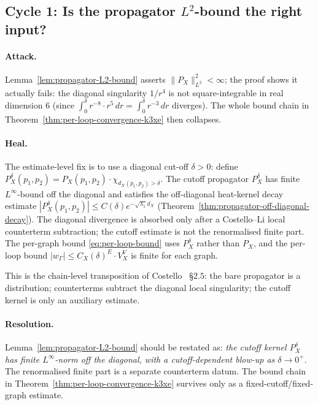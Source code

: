 \documentclass[11pt]{article}
\theoremstyle{definition}\newtheorem{definition}[theorem]{Definition}
\theoremstyle{remark}\newtheorem{remark}[theorem]{Remark}\newtheorem{example}[theorem]{Example}
\begin{document}
\subsection{Cycle 1: Is the propagator $L^2$-bound the right input?}

\paragraph{Attack.}
Lemma~\ref{lem:propagator-L2-bound} asserts $\|P_X\|_{L^2}^2 < \infty$;
the proof shows it actually fails: the diagonal singularity
$1/r^4$ is not square-integrable in real dimension $6$ (since
$\int_0^\delta r^{-8}\cdot r^5\,dr = \int_0^\delta r^{-3}\,dr$
diverges). The whole bound chain in
Theorem~\ref{thm:per-loop-convergence-k3xe} then collapses.

\paragraph{Heal.}
The estimate-level fix is to use a diagonal cut-off
$\delta > 0$: define
$P_X^\delta(p_1,p_2) = P_X(p_1,p_2)\cdot\chi_{d_X(p_1,p_2) > \delta}$.
The cutoff propagator $P_X^\delta$ has finite $L^\infty$-bound off the
diagonal and satisfies the off-diagonal heat-kernel decay estimate
$|P_X^\delta(p_1,p_2)|\leq C(\delta)e^{-\sqrt{\lambda_1}d_X}$
(Theorem~\ref{thm:propagator-off-diagonal-decay}). The diagonal
divergence is absorbed only after a Costello--Li local counterterm
subtraction; the cutoff estimate is not the renormalised finite part.
The per-graph bound
\eqref{eq:per-loop-bound} uses $P_X^\delta$ rather than $P_X$, and
the per-loop bound $|w_\Gamma|\leq C_X(\delta)^E\cdot V_X^V$ is
finite for each graph.

This is the chain-level transposition of Costello~\cite{Costello2011}
\S$2.5$: the bare propagator is a distribution; counterterms subtract
the diagonal local singularity; the cutoff kernel is only an auxiliary
estimate.

\paragraph{Resolution.}
Lemma~\ref{lem:propagator-L2-bound} should be restated as:
\emph{the cutoff kernel $P_X^\delta$ has finite $L^\infty$-norm off the
diagonal, with a cutoff-dependent blow-up as $\delta\to 0^+$}. The
renormalised finite part is a separate counterterm datum. The bound
chain in Theorem~\ref{thm:per-loop-convergence-k3xe} survives only as
a fixed-cutoff/fixed-graph estimate.
\end{document}
